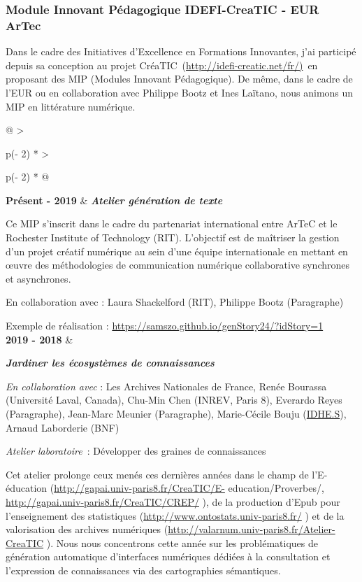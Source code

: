 \documentclass[
  a4paper,
  DIV=11,
  numbers=noendperiod]{scrreprt}
\begin{document}
\subsubsection{Module Innovant Pédagogique IDEFI-CreaTIC - EUR
ArTec}\label{module-innovant-puxe9dagogique-idefi-creatic---eur-artec}

Dans le cadre des Initiatives d'Excellence en Formations Innovantes,
j'ai participé depuis sa conception au projet
CréaTIC~(\href{http://idefi-creatic.net/fr/}{\ul{http://idefi-creatic.net/fr/}}\ul{)}~en
proposant des MIP (Modules Innovant Pédagogique). De même, dans le cadre
de l'EUR ou en collaboration avec Philippe Bootz et Ines Laïtano, nous
animons un MIP en littérature numérique.

\begin{longtable}[]{@{}
  >{\raggedright\arraybackslash}p{(\columnwidth - 2\tabcolsep) * }
  >{\raggedright\arraybackslash}p{(\columnwidth - 2\tabcolsep) * }@{}}
\toprule\noalign{}
\endhead
\bottomrule\noalign{}
\endlastfoot
\textbf{Présent - 2019} & \textbf{\emph{Atelier génération de texte}}

Ce MIP s'inscrit dans le cadre du partenariat international entre ArTeC
et le Rochester Institute of Technology (RIT). L'objectif est de
maîtriser la gestion d'un projet créatif numérique au sein d'une équipe
internationale en mettant en œuvre des méthodologies de communication
numérique collaborative synchrones et asynchrones.

En collaboration avec : Laura Shackelford (RIT), Philippe Bootz
(Paragraphe)

Exemple de réalisation :
\url{https://samszo.github.io/genStory24/?idStory=1} \\
\textbf{2019 - 2018} & \begin{minipage}[t]{\linewidth}\raggedright
\textbf{\emph{Jardiner les écosystèmes de connaissances}}

\emph{En collaboration avec} : Les Archives Nationales de France, Renée
Bourassa (Université Laval, Canada), Chu-Min Chen (INREV, Paris 8),
Everardo Reyes (Paragraphe), Jean-Marc Meunier (Paragraphe),
Marie-Cécile Bouju
(\href{https://idhes.univ-paris8.fr/-idhe-s-}{IDHE.S}), Arnaud
Laborderie (BNF)

\emph{Atelier laboratoire}~: Développer des graines de connaissances

Cet atelier prolonge ceux menés ces dernières années dans le champ de
l'E-éducation (\url{http://gapai.univ-paris8.fr/CreaTIC/E-}
education/Proverbes/, \url{http://gapai.univ-paris8.fr/CreaTIC/CREP/} ),
de la production d'Epub pour l'enseignement des statistiques
(\url{http://www.ontostats.univ-paris8.fr/} ) et de la valorisation des
archives numériques
(\url{http://valarnum.univ-paris8.fr/Atelier-CreaTIC} ). Nous nous
concentrons cette année sur les problématiques de génération automatique
d'interfaces numériques dédiées à la consultation et l'expression de
connaissances via des cartographies sémantiques.


\end{minipage}
\end{longtable}
\end{document}
